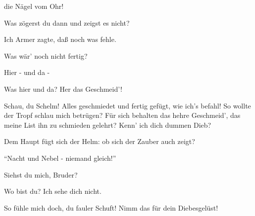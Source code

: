 \begin{drama}

die Nägel vom Ohr!
 

\Alberichspeaks


Was zögerst du dann
und zeigst es nicht?
 

\Mimespeaks
Ich Armer zagte,
daß noch was fehle.
 

\Alberichspeaks
Was wär' noch nicht fertig?
 

\Mimespeaks


Hier - und da -
 

\Alberichspeaks
Was hier und da? Her das Geschmeid'!
 



Schau, du Schelm! Alles geschmiedet
und fertig gefügt, wie ich's befahl!
So wollte der Tropf schlau mich betrügen?
Für sich behalten das hehre Geschmeid',
das meine List ihn zu schmieden gelehrt?
Kenn' ich dich dummen Dieb?
 



Dem Haupt fügt sich der Helm:
ob sich der Zauber auch zeigt?
 



``Nacht und Nebel - niemand gleich!''
 



Siehst du mich, Bruder?
 

\Mimespeaks


Wo bist du? Ich sehe dich nicht.
 

\Alberichspeaks


So fühle mich doch, du fauler Schuft!
Nimm das für dein Diebesgelüst!
 

\Mimespeaks



\end{drama}
